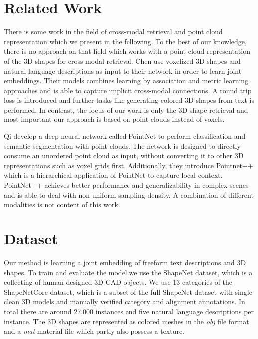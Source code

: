 \documentclass[10pt,twocolumn,letterpaper]{article}
\begin{document}
\section{Related Work}
There is some work in the field of cross-modal retrieval and point cloud representation which we present in the following. To the best of our knowledge, there is no approach on that field which works with a point cloud representation of the 3D shapes for cross-modal retrieval. 
Chen \etal \cite{chen2018text2shape} use voxelized 3D shapes and natural language descriptions as input to their network in order to learn joint embeddings. Their models combines learning by association and metric learning approaches and is able to capture implicit cross-modal connections. A round trip loss is introduced and further tasks like generating colored 3D shapes from text is performed. In contrast, the focus of our work is only the 3D shape retrieval and most important our approach is based on point clouds instead of voxels. 

Qi \etal develop a deep neural network called PointNet \cite{qi2017pointnet} to perform classification and semantic segmentation with point clouds. The network is designed to directly consume an unordered point cloud as input, without converting it to other 3D representations such as voxel grids first. Additionally, they introduce Pointnet++ \cite{qi2017Pointnet++} which is a hierarchical application of PointNet to capture local context. PointNet++ achieves better performance and generalizability in complex scenes and is able to deal with non-uniform sampling density. A combination of different modalities is not content of this work. 

\section{Dataset}
Our method is learning a joint embedding of freeform text descriptions and 3D shapes. To train and evaluate the model we use the ShapeNet \cite{Chang2015Shapenet} dataset, which is a collecting of human-designed 3D CAD objects. We use 13 categories of the ShapeNetCore dataset, which is a subset of the full ShapeNet dataset with single clean 3D models and manually verified category and alignment annotations. In total there are around 27,000 instances and five natural language descriptions per instance. The 3D shapes are represented as colored meshes in the \textit{obj} file format and a \textit{mat} material file which partly also possess a texture.
\end{document}
